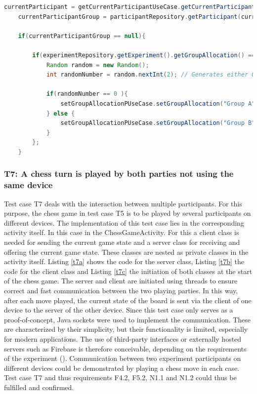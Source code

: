 \begin{lstlisting}[language=java,label=t6,lineskip={0pt}, caption=T6: Allocation of Groups, basicstyle=\scriptsize, captionpos=b]
    currentParticipant = getCurrentParticipantUseCase.getCurrentParticipant();
    currentParticipantGroup = participantRepository.getParticipant(currentParticipant).getGroupAllocation();
    
    if(currentParticipantGroup == null){
    
        if(experimentRepository.getExperiment().getGroupAllocation() == "random"){
            Random random = new Random();
            int randomNumber = random.nextInt(2); // Generates either 0 or 1
    
            if(randomNumber == 0 ){
                setGroupAllocationPUseCase.setGroupAllocation("Group A", currentParticipant);
            } else {
                setGroupAllocationPUseCase.setGroupAllocation("Group B", currentParticipant);
            }
        };
    }
\end{lstlisting}

\newpage

\subsubsection*{T7: A chess turn is played by both parties not using the same device}

Test case T7 deals with the interaction between multiple participants. For this purpose, the chess game in test case T5 is to be played by several participants on different devices. The implementation of this test case lies in the corresponding activity itself. In this case in the ChessGameActivity. For this a client class is needed for sending the current game state and a server class for receiving and offering the current game state. These classes are nested as private classes in the activity itself. Listing \ref{t7a} shows the code for the server class, Listing \ref{t7b} the code for the client class and Listing \ref{t7c} the initiation of both classes at the start of the chess game. The server and client are initiated using threads to ensure correct and fast communication between the two playing parties. In this way, after each move played, the current state of the board is sent via the client of one device to the server of the other device. Since this test case only serves as a proof-of-concept, Java sockets were used to implement the communication. These are characterized by their simplicity, but their functionality is limited, especially for modern applications. The use of third-party interfaces or externally hosted servers such as Firebase is therefore conceivable, depending on the requirements of the experiment (\cite{Google.2023b}). Communication between two experiment participants on different devices could be demonstrated by playing a chess move in each case. Test case T7 and thus requirements F4.2, F5.2, N1.1 and N1.2 could thus be fulfilled and confirmed.

